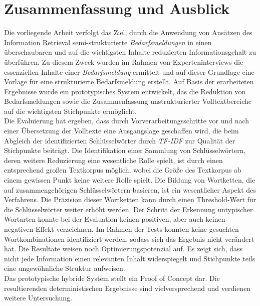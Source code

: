 \chapter{Zusammenfassung und Ausblick}
\label{chap:ergebnisseausblick}
Die vorliegende Arbeit verfolgt das Ziel, durch die Anwendung von Ansätzen des Information Retrieval semi-strukturierte \emph{Bedarfsmeldungen} in einen überschaubaren und auf die wichtigsten Inhalte reduzierten Informationsgehalt zu überführen. Zu diesem Zweck wurden im Rahmen von Experteninterviews die essenziellen Inhalte einer \emph{Bedarfsmeldung} ermittelt und auf dieser Grundlage eine Vorlage für eine strukturierte Bedarfsmeldung erstellt. Auf Basis der erarbeiteten Ergebnisse wurde ein prototypisches System entwickelt, das die Reduktion von Bedarfsmeldungen sowie die Zusammenfassung unstrukturierter Volltextbereiche auf die wichtigsten Stichpunkte ermöglicht.\\

Die Evaluierung hat ergeben, dass durch Vorverarbeitungsschritte vor und nach einer Übersetzung der Volltexte eine Ausgangslage geschaffen wird, die beim Abgleich der identifizierten Schlüsselwörter durch \emph{TF-IDF} zur Qualität der Stichpunkte beiträgt. Die Identifikation einer Sammlung von Schlüsselwörtern, deren weitere Reduzierung eine wesentliche Rolle spielt, ist durch einen entsprechend großen Textkorpus möglich, wobei die Größe des Textkorpus ab einem gewissen Punkt keine weitere Rolle spielt. Die Bildung von Wortketten, die auf zusammengehörigen Schlüsselwörtern basieren, ist ein wesentlicher Aspekt des Verfahrens. Die Präzision dieser Wortketten kann durch einen Threshold-Wert für die Schlüsselwörter weiter erhöht werden. Der Schritt der Erkennung untypischer Wortarten konnte bei der Evaluation keinen positiven, aber auch keinen negativen Effekt verzeichnen. Im Rahmen der Tests konnten keine gesuchten Wortkombinationen identifiziert werden, sodass sich das Ergebnis nicht verändert hat. Die Resultate weisen noch Optimierungspotenzial auf. Es zeigt sich, dass nicht jede Information einen relevanten Inhalt widerspiegelt und Stichpunkte teils eine ungewöhnliche Struktur aufweisen. \\

Das prototypische hybride System stellt ein Proof of Concept dar. Die resultierenden deterministischen Ergebnisse sind vielversprechend und verdienen weitere Untersuchung.


